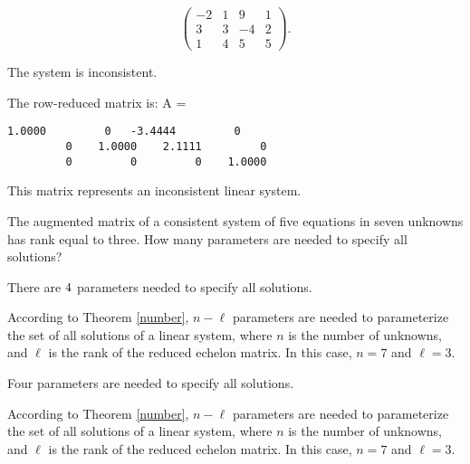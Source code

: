 \documentclass{ximera}
\begin{document}
\begin{computerExercise} \label{c2.3.1c}
\[
\left(\begin{array}{rrrr}
 -2 & 1 &  9 & 1\\
  3 & 3 & -4 & 2\\
  1 & 4 &  5 & 5
\end{array}\right).
\]

\begin{solution}
\ans The system is inconsistent.

\soln The row-reduced matrix is:
A = 
\begin{verbatim}
1.0000         0   -3.4444         0
         0    1.0000    2.1111         0
         0         0         0    1.0000
\end{verbatim}
This matrix represents an inconsistent linear system.


\end{solution}
\end{computerExercise}




\problemlabel

\begin{exercise} \label{c2.4.2}
The augmented matrix of a consistent system of five equations in seven
unknowns has rank equal to three.  How many parameters are needed to
specify all solutions?
\begin{prompt}
  There are ${4}$ parameters needed to specify all solutions.
\end{prompt}
\begin{hint}
  According to Theorem \ref{number}, $n - \ell$
parameters are needed to parameterize the set of all solutions of a
linear system, where $n$ is the number of unknowns, and $\ell$ is the
rank of the reduced echelon matrix.  In this case, $n = 7$ and $\ell =
3$.
\end{hint}

\begin{solution}

\ans Four parameters are needed to specify all solutions.

\soln According to Theorem \ref{number}, $n - \ell$
parameters are needed to parameterize the set of all solutions of a
linear system, where $n$ is the number of unknowns, and $\ell$ is the
rank of the reduced echelon matrix.  In this case, $n = 7$ and $\ell =
3$.

\end{solution}
\end{exercise}
\end{document}
